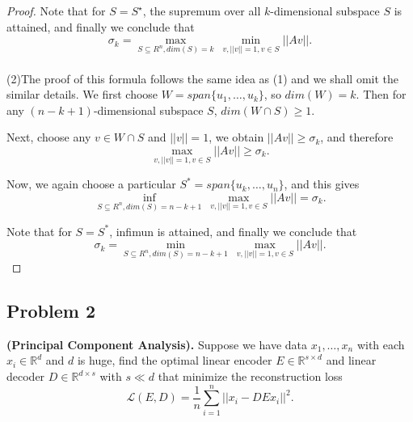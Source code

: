 \begin{proof}
Note that for $S=S^\star$, the supremum over all $k$-dimensional subspace $S$ is attained, and finally we conclude that
$$\sigma_k=\max \limits_{S\subseteq R^n,dim(S)=k}\ \min \limits_{v,||v||=1,v\in S} ||Av||.$$
\\

\noindent(2)The proof of this formula follows the same idea as (1) and we shall omit the similar details. We first choose $W=span\{u_1,\dots,u_k\}$, so $dim(W)=k$. Then for any $(n-k+1)$-dimensional subspace $S$, $dim(W\cap S)\geq 1$.

Next, choose any $v\in W\cap S$ and $||v||=1$, we obtain $||Av||\geq\sigma_k$, and therefore 
$$\max \limits_{v,||v||=1,v\in S} ||Av||\geq\sigma_k.$$

Now, we again choose a particular $S^* = span\{u_k,\dots,u_n\}$, and this gives
$$\inf \limits_{S\subseteq R^n,dim(S)=n-k+1}\ \max \limits_{v,||v||=1,v\in S} ||Av|| = \sigma_k.$$

Note that for $S=S^*$, infimun is attained, and finally we conclude that $$\sigma_k=\min \limits_{S\subseteq R^n,dim(S)=n-k+1}\ \max \limits_{v,||v||=1,v\in S} ||Av||.$$

\end{proof}

\subsection*{Problem 2}
\textbf{(Principal Component Analysis).} Suppose we have data $x_1,\dots,x_n$ with each $x_i\in {\mathbb R}^d$ and $d$ is huge, find the optimal linear encoder $E \in {\mathbb R}^{s\times d}$ and linear decoder $D\in {\mathbb R}^{d\times s}$ with $s\ll d$ that minimize the reconstruction loss
$${\mathcal L}(E,D)=\frac{1}{n}\sum\limits_{i=1}^{n}||x_i-DEx_i||^2.$$

